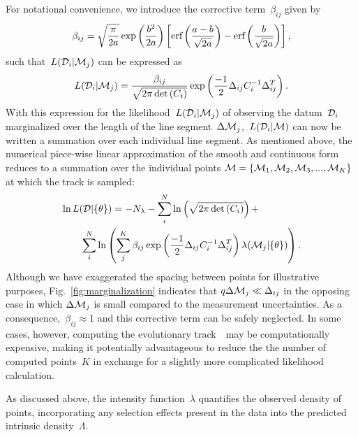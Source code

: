 \documentclass[ms.tex]{subfiles}
\begin{document}
For notational convenience, we introduce the corrective term~$\beta_{ij}$ given
by
\begin{equation}
\beta_{ij} = \sqrt{\frac{\pi}{2a}} \exp\left(\frac{b^2}{2a}\right)
\left[\text{erf}\left(\frac{a - b}{\sqrt{2a}}\right) - \text{erf}\left(\frac{b}{\sqrt{2a}}
\right)\right],
\label{eq:corrective_beta}
\end{equation}
such that~$L(\mathcal{D}_i | \mathcal{M}_j)$ can be expressed as
\begin{equation}
L(\mathcal{D}_i | \mathcal{M}_j) = \frac{\beta_{ij}}{\sqrt{2\pi \det{(C_i)}}}
\exp\left(\frac{-1}{2}\Delta_{ij} C_i^{-1} \Delta_{ij}^T\right).
\end{equation}
With this expression for the likelihood~$L(\mathcal{D}_i | \mathcal{M}_j)$ of
observing the datum~$\mathcal{D}_i$ marginalized over the length of the line
segment~$\Delta\mathcal{M}_j$,~$L(\mathcal{D}_i | \mathcal{M})$ can now be
written a summation over each individual line segment.
As mentioned above, the numerical piece-wise linear approximation of the smooth
and continuous form reduces to a summation over the individual points
$\mathcal{M} = \{\mathcal{M}_1, \mathcal{M}_2, \mathcal{M}_3, ..., \mathcal{M}_K\}$
at which the track is sampled:
\begin{equation}\begin{split}
&\ln L(\mathcal{D} | \{\theta\}) = -N_\lambda
- \sum_i^N \ln \left(\sqrt{2\pi \det{(C_i)}}\right) +
\\
&\qquad \sum_i^N \ln \left(
\sum_j^K \beta_{ij}
\exp\left(\frac{-1}{2}\Delta_{ij}C_i^{-1}\Delta_{ij}^T\right)
\lambda(\mathcal{M}_j | \{\theta\})
\right).
\end{split}\end{equation}
Although we have exaggerated the spacing between points for illustrative
purposes, Fig.~\ref{fig:marginalization} indicates that
$q\Delta\mathcal{M}_j \ll \Delta_{ij}$ in the opposing case in which
$\Delta\mathcal{M}_j$ is small compared to the measurement uncertainties.
As a consequence,~$\beta_{ij} \approx 1$ and this corrective term can be safely
neglected.
In some cases, however, computing the evolutionary track~~may be
computationally expensive, making it potentially advantageous to reduce the
the number of computed points~$K$ in exchange for a slightly more complicated
likelihood calculation.
\par
As discussed above, the intensity function~$\lambda$ quantifies the observed
density of points, incorporating any selection effects present in the data into
the predicted intrinsic density~$\Lambda$.
\end{document}
